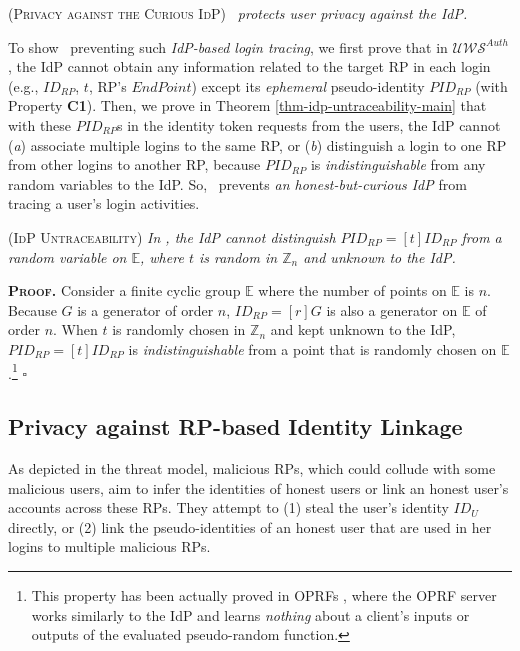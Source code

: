 \begin{thm}
\textsc{(Privacy against the Curious IdP)} \emph{\usso\ protects user privacy against the IdP.}
\label{them-idp-untraceability}
\end{thm}


To show \usso\ preventing such \emph{IdP-based login tracing}, we first prove that in $\mathcal{UWS}^{Auth}$, the IdP cannot obtain any information related to the target RP in each login (e.g., $ID_{RP}$, $t$, RP's $EndPoint$) except its \emph{ephemeral} pseudo-identity $PID_{RP}$ (with Property {\bf C1}). Then, we prove in Theorem \ref{thm-idp-untraceability-main} that with these $PID_{RP}$s in the identity token requests from the users, the IdP cannot (\emph{a}) associate multiple logins to the same RP, or (\emph{b}) distinguish a login to one RP from other logins to another RP, because $PID_{RP}$ is \emph{indistinguishable} from any random variables to the IdP. So, \usso\ prevents \emph{an honest-but-curious IdP} from tracing a user's login activities.

\begin{lemma}
\textsc{(IdP Untraceability)} \emph{In \usso, the IdP cannot distinguish $PID_{RP} = [t]ID_{RP}$ from a random variable on $\mathbb{E}$, where $t$ is random in $\mathbb{Z}_n$ and unknown to the IdP.}
\label{lemma-idp-untraceability}
\end{lemma}

\noindent\textbf{\textsc{Proof.}}
Consider a finite cyclic group $\mathbb{E}$ where the number of points on $\mathbb{E}$ is $n$.
Because $G$ is a generator of order $n$, $ID_{RP} = [r]G$ is also a generator on $\mathbb{E}$ of order $n$. %
When $t$ is randomly chosen in $\mathbb{Z}_n$ and kept unknown to the IdP, $PID_{RP} = [t]ID_{RP}$ is \emph{indistinguishable} from a point that is randomly chosen on $\mathbb{E}$ \cite{oprf-proved,voprf-proved}.\footnote{This property has been actually proved in OPRFs \cite{oprf-proved,voprf-proved}, where the OPRF server works similarly to the IdP and learns \emph{nothing} about a client's inputs or outputs of the evaluated pseudo-random function.} \hfill $\square$


\subsection{Privacy against RP-based Identity Linkage}
\label{subsec:RP-privacy}

As depicted in the threat model, malicious RPs,
which could collude with some malicious users,
aim to infer the identities of honest users
    or link an honest user's accounts across these RPs.
They attempt to (1) steal the user's identity $ID_U$ directly,
 or (2) link the pseudo-identities of an honest user that are used in her logins to multiple malicious RPs. 


